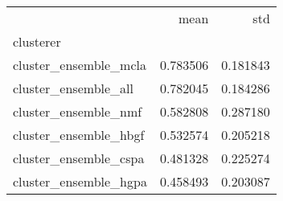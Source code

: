 \begin{tabular}{lrr}
\toprule
{} &      mean &       std \\
clusterer             &           &           \\
\midrule
cluster\_ensemble\_mcla &  0.783506 &  0.181843 \\
cluster\_ensemble\_all  &  0.782045 &  0.184286 \\
cluster\_ensemble\_nmf  &  0.582808 &  0.287180 \\
cluster\_ensemble\_hbgf &  0.532574 &  0.205218 \\
cluster\_ensemble\_cspa &  0.481328 &  0.225274 \\
cluster\_ensemble\_hgpa &  0.458493 &  0.203087 \\
\bottomrule
\end{tabular}


